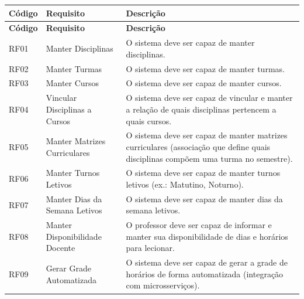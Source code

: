 \begin{longtable}{|C{1.8cm}|L{4.5cm}|L{7.1cm}|}
\hline
\textbf{Código} & \textbf{Requisito} & \textbf{Descrição} \\
\hline
\endfirsthead
\hline
\textbf{Código} & \textbf{Requisito} & \textbf{Descrição} \\
\hline
\endhead
RF01 & Manter Disciplinas & O sistema deve ser capaz de manter disciplinas. \\
\hline
RF02 & Manter Turmas & O sistema deve ser capaz de manter turmas. \\
\hline
RF03 & Manter Cursos & O sistema deve ser capaz de manter cursos. \\
\hline
RF04 & Vincular Disciplinas a Cursos & O sistema deve ser capaz de vincular e manter a relação de quais disciplinas pertencem a quais cursos. \\
\hline
RF05 & Manter Matrizes Curriculares & O sistema deve ser capaz de manter matrizes curriculares (associação que define quais disciplinas compõem uma turma no semestre). \\
\hline
RF06 & Manter Turnos Letivos & O sistema deve ser capaz de manter turnos letivos (ex.: Matutino, Noturno). \\
\hline
RF07 & Manter Dias da Semana Letivos & O sistema deve ser capaz de manter dias da semana letivos. \\
\hline
RF08 & Manter Disponibilidade Docente & O professor deve ser capaz de informar e manter sua disponibilidade de dias e horários para lecionar. \\
\hline
RF09 & Gerar Grade Automatizada & O sistema deve ser capaz de gerar a grade de horários de forma automatizada (integração com microsserviços). \\
\hline
\end{longtable}

